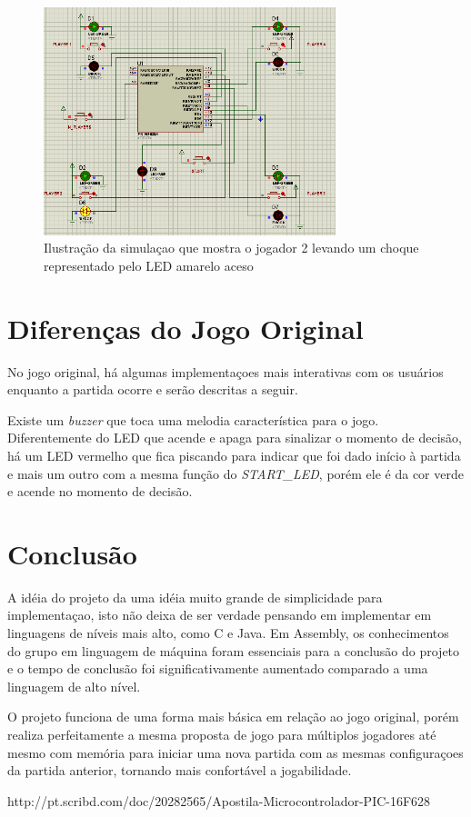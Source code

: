 \documentclass[article]{IEEEtran}
\begin{document}
	\begin{figure}	
		\centering
		\includegraphics[width=8.5cm]{./choqueP2.png}
		\caption{Ilustração da simulaçao que mostra o jogador 2 levando um choque representado pelo LED amarelo aceso}
 		\label{fig:choqueP2}
	\end{figure}

\section{Diferenças do Jogo Original}
No jogo original, há algumas implementaçoes mais interativas com os usuários enquanto a partida ocorre e serão descritas a seguir.

Existe um \textit{buzzer} que toca uma melodia característica para o jogo. Diferentemente do LED que acende e apaga para sinalizar o momento de decisão, há um LED vermelho que fica piscando para indicar que foi dado início à partida e mais um outro com a mesma função do \textit{START\_LED}, porém ele é da cor verde e acende no momento de decisão.

\section{Conclusão}
A idéia do projeto da uma idéia muito grande de simplicidade para implementaçao, isto não deixa de ser verdade pensando em implementar em linguagens de níveis mais alto, como C e Java. Em Assembly, os conhecimentos do grupo em linguagem de máquina foram essenciais para a conclusão do projeto e o tempo de conclusão foi significativamente aumentado comparado a uma linguagem de alto nível.

O projeto funciona de uma forma mais básica em relação ao jogo original, porém realiza perfeitamente a mesma proposta de jogo para múltiplos jogadores até mesmo com memória para iniciar uma nova partida com as mesmas configuraçoes da partida anterior, tornando mais confortável a jogabilidade.  

\begin{thebibliography}{eu}
http://pt.scribd.com/doc/20282565/Apostila-Microcontrolador-PIC-16F628
\end{thebibliography}
\end{document}
